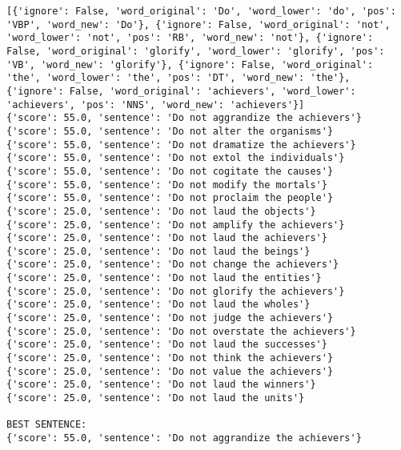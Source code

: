 \documentclass[12pt,a4paper,oneside]{book}
\begin{document}
\begin{verbatim}
[{'ignore': False, 'word_original': 'Do', 'word_lower': 'do', 'pos': 'VBP', 'word_new': 'Do'}, {'ignore': False, 'word_original': 'not', 'word_lower': 'not', 'pos': 'RB', 'word_new': 'not'}, {'ignore': False, 'word_original': 'glorify', 'word_lower': 'glorify', 'pos': 'VB', 'word_new': 'glorify'}, {'ignore': False, 'word_original': 'the', 'word_lower': 'the', 'pos': 'DT', 'word_new': 'the'}, {'ignore': False, 'word_original': 'achievers', 'word_lower': 'achievers', 'pos': 'NNS', 'word_new': 'achievers'}]
{'score': 55.0, 'sentence': 'Do not aggrandize the achievers'}
{'score': 55.0, 'sentence': 'Do not alter the organisms'}
{'score': 55.0, 'sentence': 'Do not dramatize the achievers'}
{'score': 55.0, 'sentence': 'Do not extol the individuals'}
{'score': 55.0, 'sentence': 'Do not cogitate the causes'}
{'score': 55.0, 'sentence': 'Do not modify the mortals'}
{'score': 55.0, 'sentence': 'Do not proclaim the people'}
{'score': 25.0, 'sentence': 'Do not laud the objects'}
{'score': 25.0, 'sentence': 'Do not amplify the achievers'}
{'score': 25.0, 'sentence': 'Do not laud the achievers'}
{'score': 25.0, 'sentence': 'Do not laud the beings'}
{'score': 25.0, 'sentence': 'Do not change the achievers'}
{'score': 25.0, 'sentence': 'Do not laud the entities'}
{'score': 25.0, 'sentence': 'Do not glorify the achievers'}
{'score': 25.0, 'sentence': 'Do not laud the wholes'}
{'score': 25.0, 'sentence': 'Do not judge the achievers'}
{'score': 25.0, 'sentence': 'Do not overstate the achievers'}
{'score': 25.0, 'sentence': 'Do not laud the successes'}
{'score': 25.0, 'sentence': 'Do not think the achievers'}
{'score': 25.0, 'sentence': 'Do not value the achievers'}
{'score': 25.0, 'sentence': 'Do not laud the winners'}
{'score': 25.0, 'sentence': 'Do not laud the units'}

BEST SENTENCE:
{'score': 55.0, 'sentence': 'Do not aggrandize the achievers'}



\end{verbatim}
\end{document}
